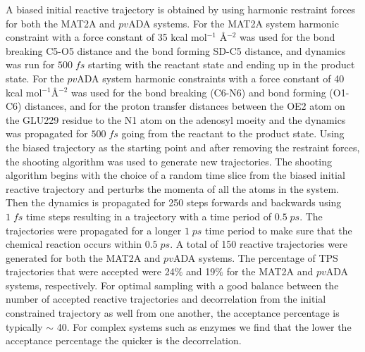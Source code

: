 \documentclass[journal=jpcbfk,manuscript=article,layout=traditional]{achemso}
\begin{document}
A biased initial reactive trajectory is obtained by using harmonic restraint forces 
for both the MAT2A and $pv$ADA systems.
For the MAT2A system harmonic constraint with a force constant of 35 kcal mol$^{-1}$ {\AA}$^{-2}$
was used for the bond breaking C5-O5 distance and the bond forming SD-C5 distance,
and dynamics was run for $500\;fs$ starting with the reactant state and ending up in the product state.   
For the $pv$ADA system harmonic constraints with a force constant of 40 kcal mol$^{-1}${\AA}$^{-2}$ 
was used for the bond breaking (C6-N6) and bond forming (O1-C6) distances, and for the proton 
transfer distances between the OE2 atom on the GLU229 residue to the N1 atom on 
the adenosyl moeity and the dynamics was propagated for $500\;fs$ going from the reactant to 
the product state. Using the biased trajectory as the starting point and after removing the restraint 
forces, the shooting algorithm \cite{dellago02AdvChemPhys123} was used to generate
new trajectories. The shooting algorithm begins with the choice of a 
random time slice from the biased initial reactive trajectory and perturbs 
the momenta of all the atoms in the system. Then the dynamics is propagated for 
250 steps forwards and backwards using $1\;fs$ time steps
resulting in a trajectory with a time period of $0.5\;ps$.
The trajectories were propagated for a longer $1\;ps$ time period 
to make sure that the chemical reaction occurs within $0.5\;ps$. 
A total of 150 reactive trajectories were generated for both the MAT2A and $pv$ADA
systems. The percentage of TPS trajectories that were accepted were 24$\%$ and 
19$\%$ for the MAT2A and $pv$ADA systems, respectively.
For optimal sampling with a good balance between the number of 
accepted reactive trajectories and decorrelation from the initial constrained
trajectory as well from one another, the acceptance percentage 
is typically $\sim$ 40. \cite{dellago02AdvChemPhys123}  
For complex systems such as enzymes we find that the lower the acceptance 
percentage the quicker is the decorrelation. 
\end{document}
